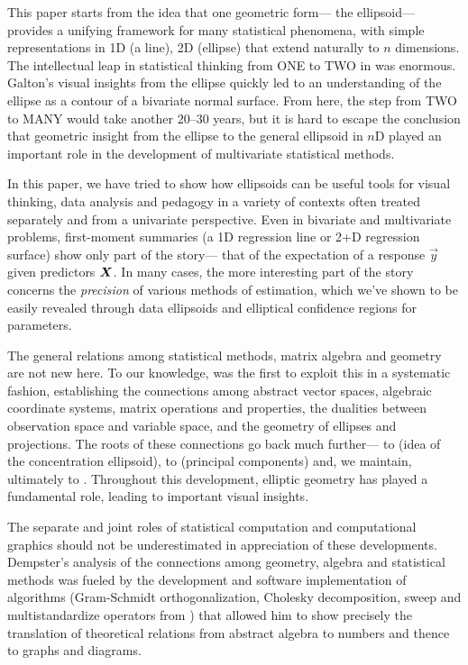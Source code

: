 This paper starts from the idea that one geometric form--- the ellipsoid---
provides a unifying framework for many statistical phenomena, with simple representations in
1D (a line), 2D (ellipse) that extend naturally to $n$ dimensions.  The intellectual leap 
in statistical thinking from ONE to TWO in \citet{Galton:1886} was enormous.
Galton's visual insights from the ellipse quickly led to an understanding of the
ellipse as a contour of a bivariate normal surface.  From here, the step from TWO to MANY
would take another 20--30 years, but it is hard to escape the conclusion that 
geometric insight from the ellipse to the general ellipsoid in $n$D
played an important role in the development of multivariate statistical methods.

In this paper, we have tried to show how ellipsoids can be useful tools for
visual thinking, data analysis and pedagogy in a variety of contexts often
treated separately and from a univariate perspective.  Even in bivariate 
and multivariate problems, first-moment summaries (a 1D regression line
or 2+D regression surface) show only part of the story--- that of the
expectation of a response $\vec{y}$ given predictors $\bm{X}$.
In many cases, the more interesting part of the story concerns the 
\emph{precision} of various methods of estimation, which we've shown
to be easily revealed through data ellipsoids and
elliptical confidence regions for parameters.

The general relations among statistical methods, matrix algebra and geometry are
not new here.  To our knowledge, \citet{Dempster:69} was the first to exploit this
in a systematic fashion, establishing the connections among abstract vector spaces,
algebraic coordinate systems, matrix operations and properties, the dualities
between observation space and variable space,
 and the geometry
of ellipses and projections.%
The roots of these connections go back much further---
to 
\citet{Cramer:1946} (idea of the concentration ellipsoid), to
\citet{Pearson:1901,Hotelling:1933} (principal components)
and, we maintain, ultimately to \citet{Galton:1886}.
Throughout this development, elliptic geometry has played 
a fundamental role, leading to important visual insights.

The separate and joint roles of statistical computation and computational graphics should not be underestimated
in appreciation of these developments.  Dempster's analysis of the connections among geometry, algebra and
statistical methods was fueled by the development and software implementation of algorithms 
(Gram-Schmidt orthogonalization, Cholesky decomposition, sweep and multistandardize operators from
\citet{Beaton:64})
that allowed him to show precisely the translation of theoretical relations
from abstract algebra to numbers and thence to graphs and diagrams.  

